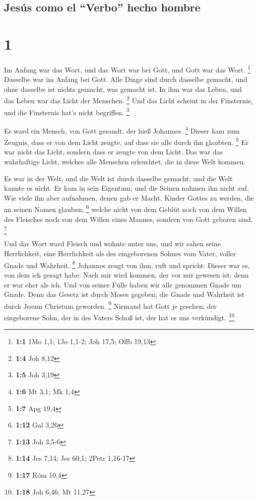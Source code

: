 \hypertarget{jesuxfas-como-el-verbo-hecho-hombre}{%
\subsection{Jesús como el ``Verbo'' hecho
hombre}\label{jesuxfas-como-el-verbo-hecho-hombre}}

\hypertarget{section}{%
\section{1}\label{section}}

 Im Anfang war das Wort, und das Wort war bei Gott, und
Gott war das Wort. \footnote{\textbf{1:1} 1Mo 1,1; 1Jo 1,1-2; Joh 17,5;
  Offb 19,13}  Dasselbe war im Anfang bei Gott.
 Alle Dinge sind durch dasselbe gemacht, und ohne dasselbe
ist nichts gemacht, was gemacht ist.  In ihm war das
Leben, und das Leben war das Licht der Menschen. \footnote{\textbf{1:4}
  Joh 8,12}  Und das Licht scheint in der Finsternis, und
die Finsternis hat's nicht begriffen. \footnote{\textbf{1:5} Joh 3,19}

 Es ward ein Mensch, von Gott gesandt, der hieß Johannes.
\footnote{\textbf{1:6} Mt 3,1; Mk 1,4}  Dieser kam zum
Zeugnis, dass er von dem Licht zeugte, auf dass sie alle durch ihn
glaubten. \footnote{\textbf{1:7} Apg 19,4}  Er war nicht
das Licht, sondern dass er zeugte von dem Licht.  Das war
das wahrhaftige Licht, welches alle Menschen erleuchtet, die in diese
Welt kommen.

 Es war in der Welt, und die Welt ist durch dasselbe
gemacht; und die Welt kannte es nicht.  Er kam in sein
Eigentum; und die Seinen nahmen ihn nicht auf.  Wie viele
ihn aber aufnahmen, denen gab er Macht, Kinder Gottes zu werden, die an
seinen Namen glauben; \footnote{\textbf{1:12} Gal 3,26} 
welche nicht von dem Geblüt noch von dem Willen des Fleisches noch von
dem Willen eines Mannes, sondern von Gott geboren sind. \footnote{\textbf{1:13}
  Joh 3,5-6}

 Und das Wort ward Fleisch und wohnte unter uns, und wir
sahen seine Herrlichkeit, eine Herrlichkeit als des eingeborenen Sohnes
vom Vater, voller Gnade und Wahrheit. \footnote{\textbf{1:14} Jes 7,14;
  Jes 60,1; 2Petr 1,16-17}  Johannes zeugt von ihm, ruft
und spricht: Dieser war es, von dem ich gesagt habe: Nach mir wird
kommen, der vor mir gewesen ist; denn er war eher als ich.
 Und von seiner Fülle haben wir alle genommen Gnade um
Gnade.  Denn das Gesetz ist durch Moses gegeben; die
Gnade und Wahrheit ist durch Jesum Christum geworden. \footnote{\textbf{1:17}
  Röm 10,4}  Niemand hat Gott je gesehen; der eingeborene
Sohn, der in des Vaters Schoß ist, der hat es uns verkündigt.
\footnote{\textbf{1:18} Joh 6,46; Mt 11,27}

